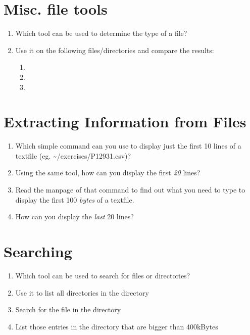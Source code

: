 \documentclass[a4paper,11pt,english]{sphinxmanual}
\begin{document}
\section{Misc. file tools}
\label{exercises/exercises_beginner:misc-file-tools}\begin{enumerate}
\item {} 
Which tool can be used to determine the type of a file?

\item {} 
Use it on the following files/directories and compare the results:
\begin{enumerate}
\item {} 

\item {} 
\code{\textasciitilde{}}

\item {} 

\end{enumerate}

\end{enumerate}


\section{Extracting Information from Files}
\label{exercises/exercises_beginner:extracting-information-from-files}\begin{enumerate}
\item {} 
Which simple command can you use to display just the first 10 lines of a textfile (eg. \textasciitilde{}/exercises/P12931.csv)?

\item {} 
Using the same tool, how can you display the first \emph{20} lines?

\item {} 
Read the manpage of that command to find out what you need to type to display the first 100 \emph{bytes} of a textfile.

\item {} 
How can you display the \emph{last} 20 lines?

\end{enumerate}


\section{Searching}
\label{exercises/exercises_beginner:searching}\begin{enumerate}
\item {} 
Which tool can be used to search for files or directories?

\item {} 
Use it to list all directories in the  directory

\item {} 
Search for the file  in the  directory

\item {} 
List those entries in the directory  that are bigger than 400kBytes

\end{enumerate}
\end{document}

